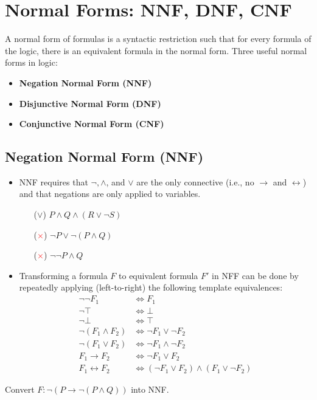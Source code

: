 \newpage
\section{Normal Forms: NNF, DNF, CNF}
A normal form of formulas is a syntactic restriction such that for every formula of the logic, there is an equivalent formula in the normal form. Three useful normal forms in logic:
\begin{itemize}
	\item \textbf{Negation Normal Form (NNF)}
	\item \textbf{Disjunctive Normal Form (DNF)}
	\item \textbf{Conjunctive Normal Form (CNF)}
\end{itemize}

\subsection{Negation Normal Form (NNF)}
\begin{itemize}
	\item NNF requires that $\lnot,\land$, and $\lor$ are the only connective (i.e., no $\to$ and $\leftrightarrow$) and that negations are only applied to variables.
	\begin{itemize}
		\item[(\textcolor{green!50!black}{$\boldsymbol{\vee}$})] $P\land Q\land (R\lor\lnot S)$
		\item[(\textcolor{red}{$\boldsymbol{\times}$})] $\lnot P\lor\lnot(P\land Q)$
		\item[(\textcolor{red}{$\boldsymbol{\times}$})] $\lnot\lnot P\land Q$
	\end{itemize}
	\item Transforming a formula $F$ to equivalent formula $F'$ in NFF can be done by repeatedly applying (left-to-right) the following template equivalences:
	\begin{align*}
		\lnot\lnot F_1 &\iff F_1 \\
		\lnot\top &\iff \bot \\
		\lnot\bot &\iff \top \\
		\lnot(F_1\land F_2) &\iff \lnot F_1\lor\lnot F_2 \\
		\lnot(F_1\lor F_2) &\iff \lnot F_1\land\lnot F_2 \\
		F_1\to F_2 &\iff \lnot F_1\lor F_2 \\
		F_1\leftrightarrow F_2 &\iff (\lnot F_1\lor F_2)\land(F_1\lor\lnot F_2)
	\end{align*}
\end{itemize}
\begin{exercise}
	Convert $F:\lnot(P\to\lnot (P\land Q))$ into NNF.
\end{exercise}

